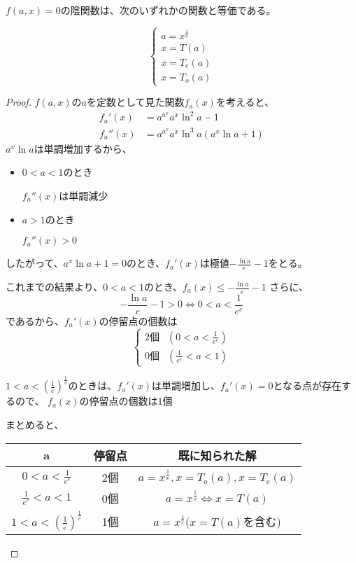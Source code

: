 	\begin{theorem}
	\label{th:all_implicit_function}
		$f(a,x)=0$の陰関数は、次のいずれかの関数と等価である。
		
		\[
		\left \{
			\begin{array}{l}
				a = x^{\frac{1}{e}} \\
				x = T(a) \\
				x = T_e(a) \\
				x = T_o(a)
			\end{array}
		\right.
		\]
	\end{theorem}
	\begin{proof}
		$f(a,x)$の$a$を定数として見た関数$f_a(x)$を考えると、
		\begin{align*}
			f_a'(x) &= {a^{a^x}}{a^x}{\ln^2 a} - 1 \\
			f_a''(x)&= {a^{a^x}}{a^x}{\ln^3 a}(a^x\ln a + 1)
		\end{align*}
		$a^x\ln a$は単調増加するから、
		
		\begin{itemize}
			\item $0 < a < 1$のとき
			
				$f_a''(x)$は単調減少
			\item $a > 1$のとき
			
				$f_a''(x) > 0$
		\end{itemize}
		したがって、$a^x\ln a + 1 = 0$のとき、$f_a'(x)$は極値$-\frac{\ln a}{e} - 1$をとる。
		
		これまでの結果より、$0 < a < 1$のとき、$f_a(x) \leq -\frac{\ln a}{e} - 1$
		さらに、
		\[
			 -\frac{\ln a}{e} - 1 > 0 
			 \iff 0 < a < \frac{1}{e^e}
		\]
		であるから、$f_a'(x)$の停留点の個数は
		\[
			\begin{cases}
				\text{2個} & (0 < a < \frac{1}{e^e}) \\
				\text{0個} & (\frac{1}{e^e} < a < 1)
			\end{cases}
		\]
		
		$1 < a < \left ( \frac{1}{e} \right )^{\frac{1}{e}}$のときは、$f_a'(x)$は単調増加し、$f_a'(x)=0$となる点が存在するので、
		$f_a(x)$の停留点の個数は1個
		
		まとめると、
		\begin{table}
		\begin{center}
		\begin{tabular}{ccc}
			a & 停留点 & 既に知られた解 \\
			\hline
			$0 < a < \frac{1}{e^e}$ & 2個 & $a = x^{\frac{1}{x}},x = T_o(a),x = T_e(a)$ \\
			$\frac{1}{e^e} < a < 1$ & 0個 & $a = x^{\frac{1}{x}} \iff x = T(a)$ \\
			$1 < a < \left ( \frac{1}{e} \right )^{\frac{1}{e}}$ & 1個 & $a = x^{\frac{1}{e}}$($x = T(a)$を含む)
		\end{tabular}
		\end{center}
		\end{table}
		

\end{proof}
